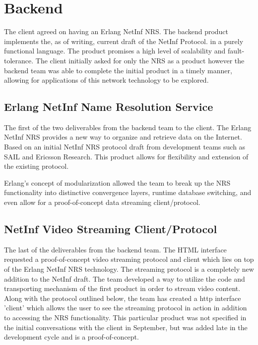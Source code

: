 \section {Backend}

The client agreed on having an Erlang NetInf NRS. The backend product implements the, as of writing, current draft of the NetInf Protocol\cite{netinfproto}.  in a purely functional language. The product promises a high level of scalability and fault-tolerance. The client initially asked for only the NRS as a product however the backend team was able to complete the initial product in a timely manner, allowing for applications of this network technology to be explored. 


\subsection {Erlang NetInf Name Resolution Service}
The first of the two deliverables from the backend team to the client. The Erlang NetInf NRS provides a new way to organize and retrieve data on the Internet. Based on an initial NetInf NRS protocol draft from development teams such as SAIL and Ericsson Research. This product allows for flexibility and extension of the existing protocol.

Erlang's concept of modularization allowed the team to break up the NRS functionality into distinctive convergence layers, runtime database switching, and even allow for a proof-of-concept data streaming client/protocol. 

\subsection{NetInf Video Streaming Client/Protocol}

The last of the deliverables from the backend team. The HTML interface requested a proof-of-concept video streaming protocol and client which lies on top of the Erlang NetInf NRS technology. The streaming protocol is a completely new addition to the NetInf draft. The team developed a way to utilize the code and transporting mechanism of the first product in order to stream video content. Along with the protocol outlined below, the team has created a http interface 'client' which allows the user to see the streaming protocol in action in addition to accessing the NRS functionality. This particular product was not specified in the initial conversations with the client in September, but was added late in the development cycle and is a proof-of-concept.

